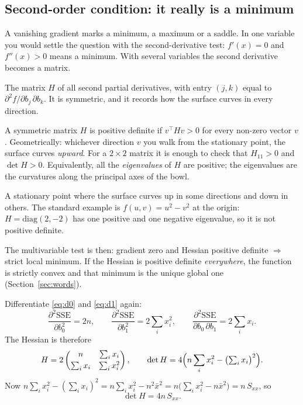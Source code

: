 \documentclass[11pt]{article}
\begin{document}
\subsection{Second-order condition: it really is a minimum}
\label{sec:soc}

A vanishing gradient marks a minimum, a maximum or a saddle. In one
variable you would settle the question with the second-derivative test:
$f'(x)=0$ and $f''(x)>0$ means a minimum. With several variables the second
derivative becomes a matrix.

\begin{description}[leftmargin=0pt]
  \item[Hessian.] The matrix $H$ of all second partial derivatives, with
    entry $(j,k)$ equal to $\partial^2 f/\partial b_j\,\partial b_k$. It is
    symmetric, and it records how the surface curves in every direction.
  \item[Positive definite.] A symmetric matrix $H$ is positive definite if
    $v^{\!\top}Hv > 0$ for every non-zero vector $v$. Geometrically: whichever
    direction $v$ you walk from the stationary point, the surface curves
    \emph{upward}. For a $2\times2$ matrix it is enough to check that
    $H_{11} > 0$ and $\det H > 0$. Equivalently, all the \emph{eigenvalues}
    of $H$ are positive; the eigenvalues are the curvatures along the
    principal axes of the bowl.
  \item[Saddle.] A stationary point where the surface curves up in some
    directions and down in others. The standard example is
    $f(u,v) = u^2 - v^2$ at the origin: $H = \mathrm{diag}(2,-2)$ has one
    positive and one negative eigenvalue, so it is not positive definite.
\end{description}

The multivariable test is then: gradient zero and Hessian positive definite
$\Rightarrow$ strict local minimum. If the Hessian is positive definite
\emph{everywhere}, the function is strictly convex and that minimum is the
unique global one (Section~\ref{sec:words}).

Differentiate \eqref{eq:d0} and \eqref{eq:d1} again:
\[
  \frac{\partial^2\mathrm{SSE}}{\partial b_0^2} = 2n, \qquad
  \frac{\partial^2\mathrm{SSE}}{\partial b_1^2} = 2\sum_i x_i^2, \qquad
  \frac{\partial^2\mathrm{SSE}}{\partial b_0\,\partial b_1} = 2\sum_i x_i .
\]
The Hessian is therefore
\begin{equation}
  H = 2\begin{pmatrix} n & \sum_i x_i\\[2pt]
                       \sum_i x_i & \sum_i x_i^2\end{pmatrix},
  \qquad
  \det H = 4\Bigl(n\sum_i x_i^2 - \bigl(\textstyle\sum_i x_i\bigr)^2\Bigr).
  \label{eq:hess}
\end{equation}
Now $n\sum_i x_i^2 - (\sum_i x_i)^2 = n\sum_i x_i^2 - n^2\bar x^2
= n\bigl(\sum_i x_i^2 - n\bar x^2\bigr) = n\,S_{xx}$, so
\begin{equation}
  \det H = 4n\,S_{xx} .
  \label{eq:dethess}
\end{equation}
\end{document}
